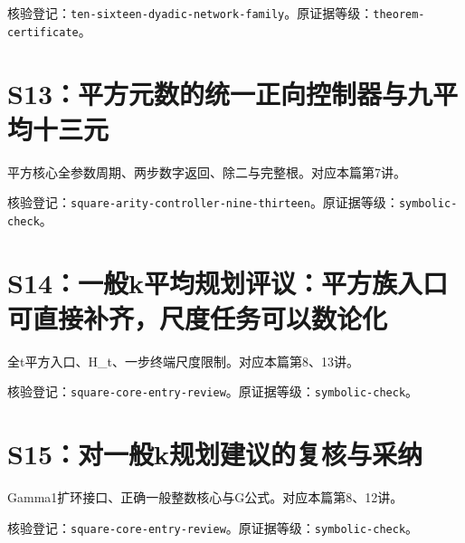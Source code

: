 \par{}\par

核验登记：{\small\nolinkurl{ten-sixteen-dyadic-network-family}}。原证据等级：{\small\nolinkurl{theorem-certificate}}。

\section{S13：平方元数的统一正向控制器与九平均十三元}\label{source:S13}

平方核心全参数周期、两步数字返回、除二与完整根。对应本篇第7讲。

\par{}\par

核验登记：{\small\nolinkurl{square-arity-controller-nine-thirteen}}。原证据等级：{\small\nolinkurl{symbolic-check}}。

\section{S14：一般k平均规划评议：平方族入口可直接补齐，尺度任务可以数论化}\label{source:S14}

全t平方入口、H\_t、一步终端尺度限制。对应本篇第8、13讲。

\par{}\par

核验登记：{\small\nolinkurl{square-core-entry-review}}。原证据等级：{\small\nolinkurl{symbolic-check}}。

\section{S15：对一般k规划建议的复核与采纳}\label{source:S15}

Gamma1扩环接口、正确一般整数核心与G公式。对应本篇第8、12讲。

\par{}\par

核验登记：{\small\nolinkurl{square-core-entry-review}}。原证据等级：{\small\nolinkurl{symbolic-check}}。

